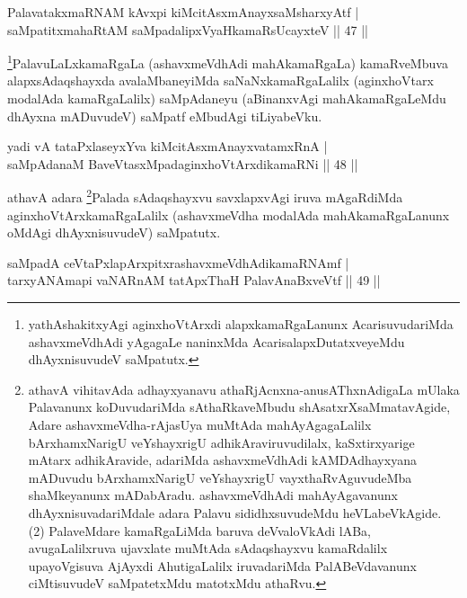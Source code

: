 
\begin{shl}
PalavatakxmaRNAM kAvxpi kiMcitAsxmAnayxsaMsharxyAtf |\\
saMpatitxmahaRtAM saMpadalipxVyaHkamaRsUcayxteV \hfill || 47 ||
\end{shl}

\begin{artha}
\footnote[1]{yathAshakitxyAgi aginxhoVtArxdi alapxkamaRgaLanunx AcarisuvudariMda ashavxmeVdhAdi yAgagaLe naninxMda AcarisalapxDutatxveyeMdu dhAyxnisuvudeV saMpatutx.}PalavuLaLxkamaRgaLa (ashavxmeVdhAdi mahAkamaRgaLa) kamaRveMbuva alapxsA\-daqshayxda avalaMbaneyiMda saNaNxkamaRgaLalilx (aginxhoVtarx modalAda kamaRgaLalilx) saMpAdaneyu (aBinanxvAgi mahAkamaRgaLeMdu dhAyxna mADuvudeV) saMpatf eMbudAgi tiLiyabeVku.
\end{artha}


\begin{shl}
yadi vA tataPxlaseyxYva kiMcitAsxmAnayxvatamxRnA |\\
saMpAdanaM BaveVtasxMpadaginxhoVtArxdikamaRNi \hfill || 48 ||
\end{shl}

\begin{artha}
athavA adara \footnote[2]{athavA vihitavAda adhayxyanavu athaRjAcnxna-anusAThxnAdigaLa mUlaka Palavanunx koDuvuda\-riMda sAthaRkaveMbudu shAsatxrXsaMmatavAgide, Adare ashavxmeVdha-rAjasUya muMtAda \-mahAyAgagaLalilx bArxhamxNarigU veYshayxrigU adhikAraviruvudilalx, kaSxtirxyarige mAtarx adhikAravide, adariMda ashavxmeVdhAdi kAMDAdhayxyana mADuvudu bArxhamxNarigU veYshayxrigU vayxthaRvAguvudeMba shaMkeyanunx mADabAradu. ashavxmeVdhAdi mahAyAgavanunx dhAyxnisuvadariMdale adara Palavu sididhxsuvudeMdu heVLabeVkAgide. (2) PalaveMdare kamaRgaLiMda baruva deVvaloVkAdi lABa, avugaLalilxruva ujavxlate muMtAda sAdaqshayxvu kamaRdalilx upayoVgisuva AjAyxdi AhutigaLalilx iruvadariMda PalABeVdavanunx ciMtisuvudeV saMpatetxMdu matotxMdu athaRvu.}Palada sAdaqshayxvu savxlapxvAgi iruva mAgaRdiMda aginxhoVtArx\-kamaRgaLalilx (ashavxmeVdha modalAda mahAkamaRgaLanunx oMdAgi dhAyxnisuvudeV) saMpatutx.
\end{artha}

\begin{shl}
saMpadA ceVtaPxlapArxpitxrashavxmeVdhAdikamaRNAmf |\\
tarxyANAmapi vaNARnAM tatApxThaH PalavAnaBxveVtf \hfill || 49 ||
\end{shl}

